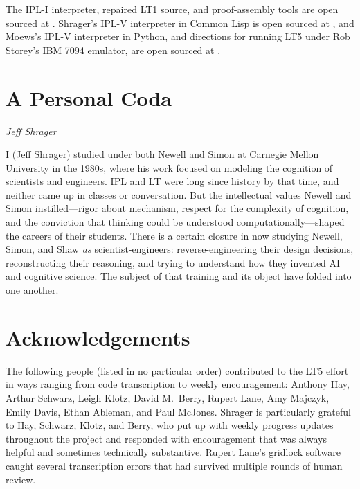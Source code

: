 \documentclass[journal]{IEEEtran}
\begin{document}
The IPL-I interpreter, repaired LT1 source, and proof-assembly tools
are open sourced at \cite{moewsrepo}.
Shrager's IPL-V interpreter in Common Lisp is open sourced at
\cite{shragerrepo}, and Moews's IPL-V interpreter
in Python, and directions for running LT5 under Rob Storey's IBM 7094
emulator, are open sourced at \cite{moewsrepo2}.

\section*{A Personal Coda}

%
%

{\em Jeff Shrager}

I (Jeff Shrager) studied under both Newell and Simon at Carnegie
Mellon University in the 1980s, where his work focused on modeling the
cognition of scientists and engineers. IPL and LT were long since
history by that time, and neither came up in classes or
conversation. But the intellectual values Newell and Simon
instilled---rigor about mechanism, respect for the complexity of
cognition, and the conviction that thinking could be understood
computationally---shaped the careers of their students. There is a
certain closure in now studying Newell, Simon, and Shaw \textit{as}
scientist-engineers: reverse-engineering their design decisions,
reconstructing their reasoning, and trying to understand how they
invented AI and cognitive science. The subject of that training and
its object have folded into one another.

\section*{Acknowledgements}


The following people (listed in no particular order) contributed to
the LT5 effort in ways ranging from code transcription to weekly
encouragement: Anthony Hay, Arthur Schwarz, Leigh Klotz, David
M.\ Berry, Rupert Lane, Amy Majczyk, Emily Davis, Ethan Ableman, and
Paul McJones. Shrager is particularly grateful to Hay, Schwarz, Klotz,
and Berry, who put up with weekly progress updates throughout the
project and responded with encouragement that was always helpful and
sometimes technically substantive. Rupert Lane's gridlock software
caught several transcription errors that had survived multiple rounds
of human review.
\end{document}
